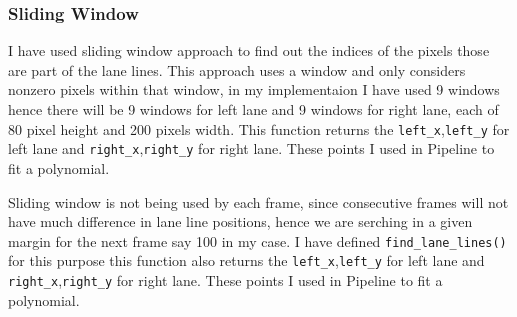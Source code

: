 \documentclass[11pt]{article}
\begin{document}
    \hypertarget{sliding-window}{%
\subsubsection{Sliding Window}\label{sliding-window}}

I have used sliding window approach to find out the indices of the
pixels those are part of the lane lines. This approach uses a window and
only considers nonzero pixels within that window, in my implementaion I
have used 9 windows hence there will be 9 windows for left lane and 9
windows for right lane, each of 80 pixel height and 200 pixels width.
This function returns the \texttt{left\_x},\texttt{left\_y} for left
lane and \texttt{right\_x},\texttt{right\_y} for right lane. These
points I used in Pipeline to fit a polynomial.

Sliding window is not being used by each frame, since consecutive frames
will not have much difference in lane line positions, hence we are
serching in a given margin for the next frame say 100 in my case. I have
defined \texttt{find\_lane\_lines()} for this purpose this function also
returns the \texttt{left\_x},\texttt{left\_y} for left lane and
\texttt{right\_x},\texttt{right\_y} for right lane. These points I used
in Pipeline to fit a polynomial.
\end{document}
